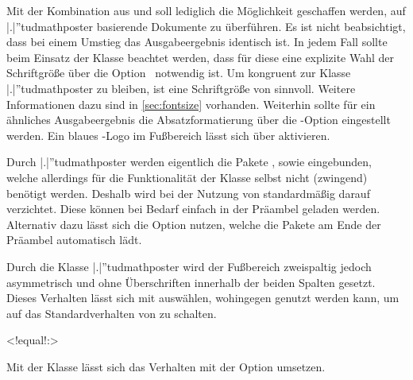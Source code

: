 \begin{DeclareEntity}{}
\begin{NoIndexDefault}
Mit der Kombination aus  und  soll 
lediglich die Möglichkeit geschaffen werden, auf \Class|.|''{tudmathposter} 
basierende Dokumente zu überführen. Es ist nicht beabsichtigt, dass bei einem 
Umstieg das Ausgabeergebnis identisch ist. In jedem Fall sollte beim Einsatz 
der Klasse  beachtet werden, dass für diese eine explizite 
Wahl der Schriftgröße über die Option~ notwendig ist. Um 
kongruent zur Klasse \Class|.|''{tudmathposter} zu bleiben, ist eine 
Schriftgröße von  sinnvoll. Weitere Informationen dazu sind 
in \autoref{sec:fontsize} vorhanden. Weiterhin sollte für ein ähnliches 
Ausgabeergebnis die Absatzformatierung über die \KOMAScript-Option 
 eingestellt werden. Ein blaues \DDC-Logo im Fußbereich 
lässt sich über  aktivieren.

\begin{Declaration}
  {}
\printdeclarationlist

Durch \Class|.|''{tudmathposter} werden eigentlich die Pakete , 
 sowie  eingebunden, welche allerdings für 
die Funktionalität der Klasse selbst nicht (zwingend) benötigt werden. Deshalb 
wird bei der Nutzung von  standardmäßig darauf verzichtet. 
Diese können bei Bedarf einfach in der Präambel geladen werden. Alternativ 
dazu lässt sich die Option  nutzen, welche die Pakete am 
Ende der Präambel automatisch lädt.
\end{Declaration}

\begin{Declaration}
  {}%
\printdeclarationlist

Durch die Klasse \Class|.|''{tudmathposter} wird der Fußbereich zweispaltig 
jedoch asymmetrisch und ohne Überschriften innerhalb der beiden Spalten 
gesetzt. Dieses Verhalten lässt sich mit  auswählen, 
wohingegen  genutzt werden kann, um auf das 
Standardverhalten von  zu schalten.
\end{Declaration}

\begin{Declaration}
  {}
  <!equal!:>
\printdeclarationlist

Mit der Klasse  lässt sich das Verhalten mit der Option 
 umsetzen.
\end{Declaration}


\end{NoIndexDefault}
\end{DeclareEntity}
